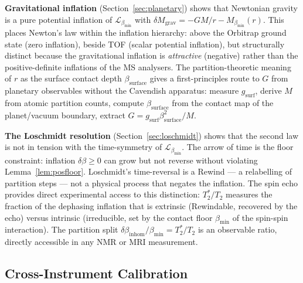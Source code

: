 \documentclass[12pt, a4paper]{article}
\theoremstyle{plain}
\theoremstyle{definition}
\theoremstyle{remark}
\newcommand{\bmin}{\beta_{\min}}
\newcommand{\Lmin}{\mathcal{L}_{\bmin}}
\begin{document}
\textbf{Gravitational inflation} (Section~\ref{sec:planetary}) shows that
Newtonian gravity is a pure potential inflation of $\Lmin$ with
$\delta M_{\mathrm{grav}} = -GM/r - M_{\bmin}(r)$. This places Newton's law
within the inflation hierarchy: above the Orbitrap ground state (zero inflation),
beside TOF (scalar potential inflation), but structurally distinct because the
gravitational inflation is \emph{attractive} (negative) rather than the
positive-definite inflations of the MS analysers. The partition-theoretic meaning
of $r$ as the surface contact depth $\beta_{\mathrm{surface}}$ gives a
first-principles route to $G$ from planetary observables without the Cavendish
apparatus: measure $g_{\mathrm{surf}}$, derive $M$ from atomic partition counts,
compute $\beta_{\mathrm{surface}}$ from the contact map of the planet/vacuum
boundary, extract $G = g_{\mathrm{surf}}\beta_{\mathrm{surface}}^2/M$.

\textbf{The Loschmidt resolution} (Section~\ref{sec:loschmidt}) shows that the
second law is not in tension with the time-symmetry of $\Lmin$. The arrow of
time is the floor constraint: inflation $\delta\beta \geq 0$ can grow but not
reverse without violating Lemma~\ref{lem:posfloor}. Loschmidt's time-reversal
is a Rewind --- a relabelling of partition steps --- not a physical process that
negates the inflation. The spin echo provides direct experimental access to this
distinction: $T_2^*/T_2$ measures the fraction of the dephasing inflation that
is extrinsic (Rewindable, recovered by the echo) versus intrinsic (irreducible,
set by the contact floor $\bmin$ of the spin-spin interaction). The partition
split $\delta\beta_{\mathrm{inhom}}/\bmin = T_2^*/T_2$ is an observable ratio,
directly accessible in any NMR or MRI measurement.

\subsection{Cross-Instrument Calibration}
\end{document}
